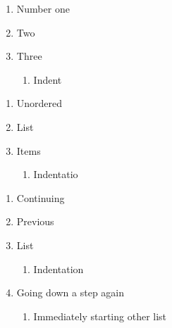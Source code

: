 \documentclass{article}
\begin{document}
\begin{enumerate}


  \item Number one



  \item Two



  \item Three

        \begin{enumerate}


          \item Indent


        \end{enumerate}
\end{enumerate}



\begin{enumerate}


  \item Unordered



  \item List



  \item Items

        \begin{enumerate}


          \item Indentatio


        \end{enumerate}
\end{enumerate}



\begin{enumerate}


  \item Continuing



  \item Previous



  \item List

        \begin{enumerate}


          \item Indentation


        \end{enumerate}

  \item Going down a step again

        \begin{enumerate}


          \item Immediately starting other list


        \end{enumerate}
\end{enumerate}
\end{document}
